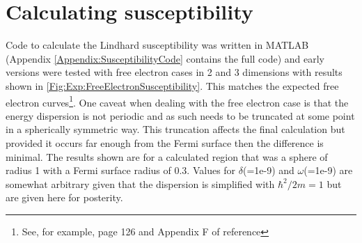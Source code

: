 \section{Calculating susceptibility}
    \label{Sec:Exp:Susceptibility}

Code to calculate the Lindhard susceptibility was written in MATLAB (Appendix \ref{Appendix:SusceptibilityCode} contains the full code) and early versions were tested with free electron cases in 2 and 3 dimensions with results shown in \fig\ref{Fig:Exp:FreeElectronSusceptibility}. This matches the expected free electron curves\footnote{See, for example, page 126 and Appendix F of reference\cite{Dressel2002}}. One caveat when dealing with the free electron case is that the energy dispersion is not periodic and as such needs to be truncated at some point in a spherically symmetric way. This truncation affects the final calculation but provided it occurs far enough from the Fermi surface then the difference is minimal. The results shown are for a calculated region that was a sphere of radius 1 with a Fermi surface radius of 0.3. Values for $\delta$(=1e-9) and $\omega$(=1e-9) are somewhat arbitrary given that the dispersion is simplified with $\hbar^2/2m = 1$ but are given here for posterity. 

